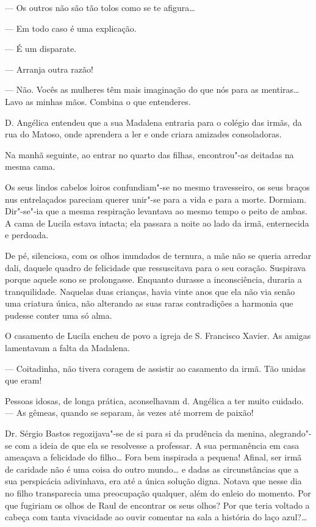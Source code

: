 --- Os outros não são tão tolos como se te afigura\ldots{}

--- Em todo caso é uma explicação.

--- É um disparate.

--- Arranja outra razão!

--- Não. Vocês as mulheres têm mais imaginação do que nós para as
mentiras\ldots{} Lavo as minhas mãos. Combina o que entenderes.

D. Angélica entendeu que a sua Madalena entraria para o colégio das
irmãs, da rua do Matoso, onde aprendera a ler e onde criara amizades
consoladoras.

Na manhã seguinte, ao entrar no quarto das filhas, encontrou"-as deitadas
na mesma cama.

Os seus lindos cabelos loiros confundiam"-se no mesmo travesseiro, os
seus braços nus entrelaçados pareciam querer unir"-se para a vida e para
a morte. Dormiam. Dir"-se"-ia que a mesma respiração levantava ao mesmo
tempo o peito de ambas. A cama de Lucila estava intacta; ela passara a
noite ao lado da irmã, enternecida e perdoada.

De pé, silenciosa, com os olhos inundados de ternura, a mãe não se
queria arredar dali, daquele quadro de felicidade que ressuscitava para
o seu coração. Suspirava porque aquele sono se prolongasse. Enquanto
durasse a inconsciência, duraria a tranquilidade. Naquelas duas
crianças, havia vinte anos que ela não via senão uma criatura única, não
alterando as suas raras contradições a harmonia que pudesse conter uma
só alma.

O casamento de Lucila encheu de povo a igreja de S. Francisco Xavier. As
amigas lamentavam a falta da Madalena.

--- Coitadinha, não tivera coragem de assistir ao casamento da irmã. Tão
unidas que eram!

Pessoas idosas, de longa prática, aconselhavam d. Angélica a ter muito
cuidado. --- As gêmeas, quando se separam, às vezes até morrem de
paixão!

Dr. Sérgio Bastos regozijava"-se de si para si da prudência da menina,
alegrando"-se com a ideia de que ela se resolvesse a professar. A sua
permanência em casa ameaçava a felicidade do filho\ldots{} Fora bem inspirada
a pequena! Afinal, ser irmã de caridade não é uma coisa do outro
mundo\ldots{} e dadas as circunstâncias que a sua perspicácia adivinhava, era
até a única solução digna. Notava que nesse dia no filho transparecia
uma preocupação qualquer, além do enleio do momento. Por que fugiriam os
olhos de Raul de encontrar os seus olhos? Por que teria voltado a cabeça
com tanta vivacidade ao ouvir comentar na sala a história do laço
azul?\ldots{}

